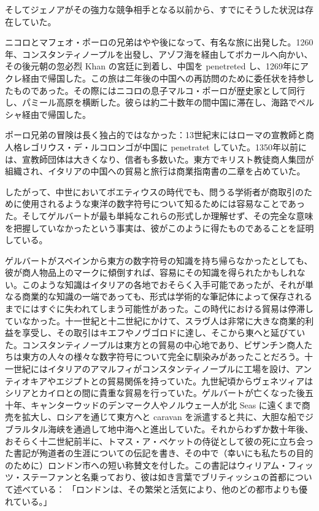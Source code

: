 \documentclass[a4paper,11pt,openany]{ltjsbook}
\begin{document}
そしてジェノアがその強力な競争相手となる以前から、すでにそうした状況は存在していた。

ニコロとマフェオ・ポーロの兄弟はやや後になって、有名な旅に出発した。1260年、コンスタンティノープルを出發し、アゾフ海を経由してボカールへ向かい、その後元朝の忽必烈 Khan の宮廷に到着し、中国を penetreted し、1269年にアクレ経由で帰国した。この旅は二年後の中国への再訪問のために委任状を持参したものであった。その際にはニコロの息子マルコ・ポーロが歴史家として同行し、パミール高原を横断した。彼らは約二十数年の間中国に滞在し、海路でペルシャ経由で帰国した。

ポーロ兄弟の冒険は長く独占的ではなかった：13世紀末にはローマの宣教師と商人格レゴリウス・デ・ルコロンゴが中国に penetratet していた。1350年以前には、宣教師団体は大きくなり、信者も多数いた。東方でキリスト教徒商人集団が組織され、イタリアの中国への貿易と旅行は商業指南書の二章を占めていた。

したがって、中世においてボエティウスの時代でも、問うる学術者が商取引のために使用されるような東洋の数字符号について知るためには容易なことであった。そしてゲルバートが最も単純なこれらの形式しか理解せず、その完全な意味を把握していなかったという事実は、彼がこのように得たものであることを証明している。

ゲルバートがスペインから東方の数字符号の知識を持ち帰らなかったとしても、彼が商人物品上のマークに傾倒すれば、容易にその知識を得られたかもしれない。このような知識はイタリアの各地でおそらく入手可能であったが、それが単なる商業的な知識の一端であっても、形式は学術的な筆記体によって保存されるまでにはすぐに失われてしまう可能性があった。この時代における貿易は停滞していなかった。十一世紀と十二世紀にかけて、スラヴ人は非常に大きな商業的利益を享受し、その取引はキエフやノヴゴロドに達し、そこから東へと延びていた。コンスタンティノープルは東方との貿易の中心地であり、ビザンチン商人たちは東方の人々の様々な数字符号について完全に馴染みがあったことだろう。十一世紀にはイタリアのアマルフィがコンスタンティノープルに工場を設け、アンティオキアやエジプトとの貿易関係を持っていた。九世紀頃からヴェネツィアはシリアとカイロとの間に貴重な貿易を行っていた。ゲルバートが亡くなった後五十年、キャンターウッドのデンマーク人やノルウェー人が北 Seas に遠くまで商売を拡大し、ロシアを通じて東方へと caravan を派遣すると共に、大胆な船でジブラルタル海峡を通過して地中海へと進出していた。それからわずか数十年後、おそらく十二世紀前半に、トマス・ア・ベケットの侍従として彼の死に立ち会った書記が殉道者の生涯についての伝記を書き、その中で（幸いにも私たちの目的のために）ロンドン市への短い称賛文を付した。この書記はウィリアム・フィッツ・ステーファンと名乗っており、彼は如き言葉でブリティッシュの首都について述べている：
「ロンドンは、その繁栄と活気により、他のどの都市よりも優れている。」
\end{document}
